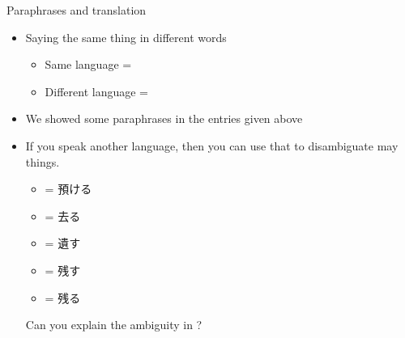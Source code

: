 \begin{frame}{Paraphrases and translation}

\begin{itemize}
\item Saying the same thing in different words
  \begin{itemize}
  \item Same language = 
  \item Different language = 
  \end{itemize}
\item We showed some paraphrases in the entries given above
\item If you speak another language, then you can use that to
  disambiguate may things.
  \begin{itemize}
  \item {} = 預ける 
  \item {} = 去る 
  \item {} = 遺す 
  \item {} = 残す 
  \item {} = 残る 
  \end{itemize}
  \begin{taskb}
    Can you explain the ambiguity in ?
  \end{taskb}
\end{itemize}
\end{frame}



